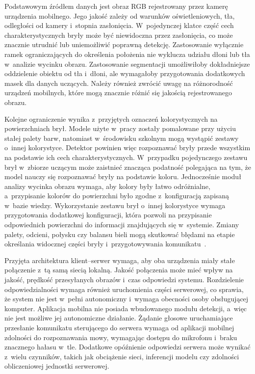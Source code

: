 Podstawowym źródłem danych jest obraz RGB rejestrowany przez kamerę urządzenia mobilnego. Jego jakość zależy od warunków oświetleniowych, tła, odległości od kamery i~stopnia zasłonięcia. W~pojedynczej klatce część cech charakterystycznych bryły może być niewidoczna przez zasłonięcia, co może znacznie utrudnić lub uniemożliwić poprawną detekcję. Zastosowanie wyłącznie ramek ograniczających do określenia położenia nie wyklucza udziału dłoni lub tła w~analizie wycinku obrazu. Zastosowanie segmentacji umożliwiłoby dokładniejsze oddzielenie obiektu od tła i~dłoni, ale wymagałoby przygotowania dodatkowych masek dla danych uczących. Należy również zwrócić uwagę na różnorodność urządzeń mobilnych, które mogą znacznie różnić się jakością rejestrowanego obrazu.

Kolejne ograniczenie wynika z~przyjętych oznaczeń kolorystycznych na powierzchniach brył. Modele użyte w~pracy zostały pomalowane przy użyciu stałej palety barw, natomiast w~środowisku szkolnym mogą wystąpić zestawy o~innej kolorystyce. Detektor powinien więc rozpoznawać bryły przede wszystkim na podstawie ich cech charakterystycznych. W~przypadku pojedynczego zestawu brył w~zbiorze uczącym może zaistnieć znacząca podatność polegająca na tym, że model nauczy się rozpoznawać bryły na podstawie koloru. Jednocześnie moduł analizy wycinka obrazu wymaga, aby kolory były łatwo odróżnialne, a~przypisanie kolorów do powierzchni było zgodne z~konfiguracją zapisaną w~bazie wiedzy. Wykorzystanie zestawu brył o~innej kolorystyce wymaga przygotowania dodatkowej konfiguracji, która pozwoli na przypisanie odpowiednich powierzchni do informacji znajdujących się w~systemie. Zmiany palety, odcieni, połysku czy balansu bieli mogą skutkować błędami na etapie określania widocznej części bryły i~przygotowywania komunikatu~.

Przyjęta architektura klient--serwer wymaga, aby oba urządzenia miały stałe połączenie z~tą samą siecią lokalną. Jakość połączenia może mieć wpływ na jakość, prędkość przesyłanych obrazów i~czas odpowiedzi systemu. Rozdzielenie odpowiedzialności wymaga również uruchomienia części serwerowej, co sprawia, że system nie jest w~pełni autonomiczny i~wymaga obecności osoby obsługującej komputer. Aplikacja mobilna nie posiada wbudowanego modułu detekcji, a~więc nie jest możliwe jej autonomiczne działanie. Żądanie głosowe uruchamiające przesłanie komunikatu sterującego do serwera wymaga od aplikacji mobilnej zdolności do rozpoznawania mowy, wymagając dostępu do mikrofonu i~braku znacznego hałasu w~tle. Dodatkowe opóźnienie odpowiedzi serwera może wynikać z~wielu czynników, takich jak obciążenie sieci, inferencji modelu czy zdolności obliczeniowej jednostki serwerowej.

